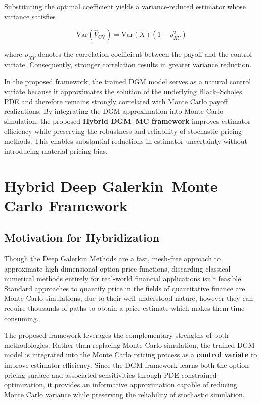 \documentclass[12pt, a4paper]{article}
\begin{document}
Substituting the optimal coefficient yields a variance-reduced estimator
whose variance satisfies

\begin{equation}
    \mathrm{Var}(\hat{V}_{\mathrm{CV}})
    = \mathrm{Var}(X)\left(1 - \rho_{XY}^2\right)
    \label{eq:var_reduction}
\end{equation}

where $\rho_{XY}$ denotes the correlation coefficient between the
payoff and the control variate. Consequently, stronger correlation
results in greater variance reduction.

In the proposed framework, the trained DGM model serves as a natural
control variate because it approximates the solution of the underlying
Black--Scholes PDE and therefore remains strongly correlated with Monte
Carlo payoff realizations. By integrating the DGM approximation into
Monte Carlo simulation, the proposed \textbf{Hybrid DGM--MC framework}
improves estimator efficiency while preserving the robustness and
reliability of stochastic pricing methods. This enables substantial
reductions in estimator uncertainty without introducing material pricing
bias.


\section{Hybrid Deep Galerkin--Monte Carlo Framework}

\subsection{Motivation for Hybridization}

Though the Deep Galerkin Methods are a fast, mesh-free approach to
approximate high-dimensional option price functions, discarding
classical numerical methods entirely for real-world financial
applications isn't feasible. Standard approaches to quantify price in
the fields of quantitative finance are Monte Carlo simulations, due to
their well-understood nature, however they can require thousands of
paths to obtain a price estimate which makes them time-consuming.

The proposed framework leverages the complementary strengths of both
methodologies. Rather than replacing Monte Carlo simulation, the
trained DGM model is integrated into the Monte Carlo pricing process
as a \textbf{control variate} to improve estimator efficiency. Since
the DGM framework learns both the option pricing surface and associated
sensitivities through PDE-constrained optimization, it provides an
informative approximation capable of reducing Monte Carlo variance
while preserving the reliability of stochastic simulation.
\end{document}
